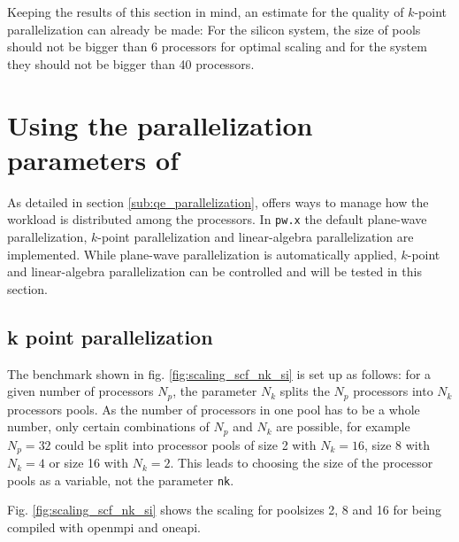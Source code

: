 \documentclass[main.tex]{subfiles}
\begin{document}
Keeping the results of this section in mind, an estimate for the quality of \(k\)-point parallelization can already be made:
For the silicon system, the size of pools should not be bigger than 6 processors for optimal scaling and for the \TaS system they should not be bigger than 40 processors.

\section{Using the parallelization parameters of \QE}\label{sec:scf_scaling_qe_parallelization}

As detailed in section \ref{sub:qe_parallelization}, \QE offers ways to manage how the workload is distributed among the processors.
In \texttt{pw.x} the default plane-wave parallelization, \(k\)-point parallelization and linear-algebra parallelization are implemented.
While plane-wave parallelization is automatically applied, \(k\)-point and linear-algebra parallelization can be controlled and will be tested in this section.

\subsection{k point parallelization}\label{sub:scf_scaling_k_point}

The benchmark shown in fig. \ref{fig:scaling_scf_nk_si} is set up as follows: for a given number of processors \(N_p\), the parameter \(N_k\) splits the \(N_p\) processors into \(N_k\) processors pools.
As the number of processors in one pool has to be a whole number, only certain combinations of \(N_p\) and \(N_k\) are possible, for example \(N_p = 32\) could be split into processor pools of size 2 with \(N_k = 16\), size 8 with \(N_k = 4\) or size 16 with \(N_k = 2\).
This leads to choosing the size of the processor pools as a variable, not the parameter \texttt{nk}.

Fig. \ref{fig:scaling_scf_nk_si} shows the scaling for poolsizes 2, 8 and 16 for \QE being compiled with \gls{openmpi} and \gls{oneapi}.
\end{document}
